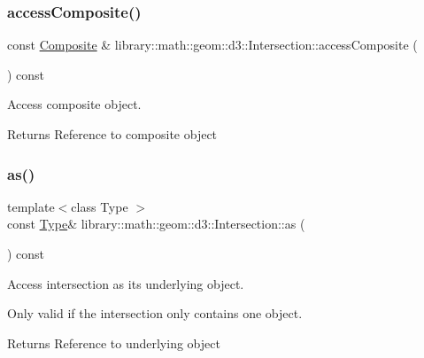 \subsubsection{\texorpdfstring{access\+Composite()}{accessComposite()}}
{\footnotesize\ttfamily const \hyperlink{classlibrary_1_1math_1_1geom_1_1d3_1_1objects_1_1_composite}{Composite} \& library\+::math\+::geom\+::d3\+::\+Intersection\+::access\+Composite (\begin{DoxyParamCaption}{ }\end{DoxyParamCaption}) const}



Access composite object. 

\begin{DoxyReturn}{Returns}
Reference to composite object 
\end{DoxyReturn}
\mbox{\label{classlibrary_1_1math_1_1geom_1_1d3_1_1_intersection_a018842f95665de8a388f0b7cd48410a6}} 
\subsubsection{\texorpdfstring{as()}{as()}}
{\footnotesize\ttfamily template$<$class Type $>$ \\
const \hyperlink{classlibrary_1_1math_1_1geom_1_1d3_1_1_intersection_a3465d607fd42380f350598e055271b05}{Type}\& library\+::math\+::geom\+::d3\+::\+Intersection\+::as (\begin{DoxyParamCaption}{ }\end{DoxyParamCaption}) const\hspace{0.3cm}{\ttfamily [inline]}}



Access intersection as its underlying object. 

Only valid if the intersection only contains one object.

\begin{DoxyReturn}{Returns}
Reference to underlying object 
\end{DoxyReturn}
\mbox{\label{classlibrary_1_1math_1_1geom_1_1d3_1_1_intersection_af0f1aed5c97a5142a4b20cb8edcb78e0}} 

